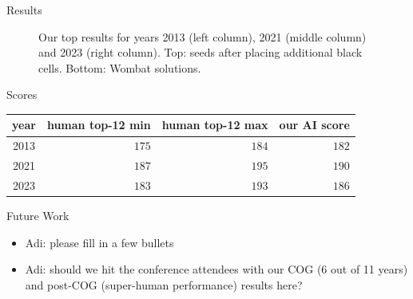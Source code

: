 \documentclass[aspectratio=169,usenames,dvipsnames]{beamer}
\newcommand{\tcg}[1]{\textcolor{m5}{#1}}
\newcommand{\tcm}[1]{\textcolor{m7}{#1}}
\newcommand{\bei}{\begin{itemize}}
\newcommand{\eei}{\end{itemize}}
\newcommand{\ie}{\item}
\numberwithin{equation}{section}
\numberwithin{theorem}{section}
\numberwithin{lem}{section}
\numberwithin{df}{section}
\begin{document}
\begin{frame}{Results}
\begin{figure}
\caption{Our top results for years 2013 (left column), 2021 (middle column) and 2023 (right column). Top: seeds after placing additional black cells. Bottom: {\sc Wombat} solutions.}
\end{figure}

\end{frame}


\begin{frame}{Scores}

\begin{table}[htbp]
\centering
\begin{tabular}{c|r|r|r}
\toprule
{\bf year} & {\bf human top-12 min} & {\bf human top-12 max} & {\bf our AI score} \\
\midrule
2013 & $175$ & $184$ & \tcg{$182$} \\ 
2021 & $187$ & $195$ & \tcg{$190$} \\ 
2023 & $183$ & $193$ & \tcg{$186$} \\ 
\bottomrule
\end{tabular}
\end{table}


\end{frame}




\begin{frame}{Future Work}

\bei

\ie \tcm{Adi: please fill in a few bullets}

\bigskip

\ie \tcm{Adi: should we hit the conference attendees with our COG (6 out of 11 years) and post-COG (super-human performance) results here?}

\bigskip

\eei


\end{frame}


\end{document}
